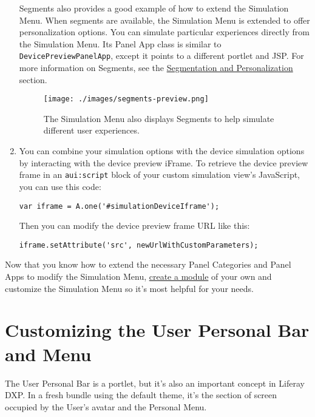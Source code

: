 \begin{enumerate}
  Segments also provides a good example of how to extend the Simulation
  Menu. When segments are available, the Simulation Menu is extended to
  offer personalization options. You can simulate particular experiences
  directly from the Simulation Menu. Its Panel App class is similar to
  \texttt{DevicePreviewPanelApp}, except it points to a different
  portlet and JSP. For more information on Segments, see the
  \href{/docs/7-2/user/-/knowledge_base/u/segmentation-and-personalization}{Segmentation
  and Personalization} section.

  \begin{figure}
  \centering
  \texttt{[image: ./images/segments-preview.png]}
  \caption{The Simulation Menu also displays Segments to help simulate
  different user experiences.}
  \end{figure}
\item
  You can combine your simulation options with the device simulation
  options by interacting with the device preview iFrame. To retrieve the
  device preview frame in an \texttt{aui:script} block of your custom
  simulation view's JavaScript, you can use this code:

\begin{verbatim}
var iframe = A.one('#simulationDeviceIframe');
\end{verbatim}

  Then you can modify the device preview frame URL like this:

\begin{verbatim}
iframe.setAttribute('src', newUrlWithCustomParameters);
\end{verbatim}
\end{enumerate}

Now that you know how to extend the necessary Panel Categories and Panel
Apps to modify the Simulation Menu,
\href{/docs/7-2/reference/-/knowledge_base/r/creating-a-project}{create
a module} of your own and customize the Simulation Menu so it's most
helpful for your needs.

\chapter{Customizing the User Personal Bar and
Menu}\label{customizing-the-user-personal-bar-and-menu}

The User Personal Bar is a portlet, but it's also an important concept
in Liferay DXP. In a fresh bundle using the default theme, it's the
section of screen occupied by the User's avatar and the Personal Menu.

